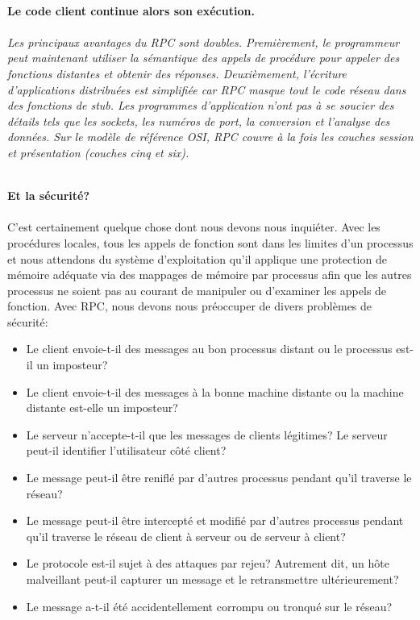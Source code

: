 \textbf{\\Le code client continue alors son exécution.}\\\\
\emph{Les principaux avantages du RPC sont doubles. Premièrement, le programmeur peut maintenant utiliser la sémantique des appels de procédure pour appeler des fonctions distantes et obtenir des réponses. Deuxièmement, l'écriture d'applications distribuées est simplifiée car RPC masque tout le code réseau dans des fonctions de stub. Les programmes d'application n'ont pas à se soucier des détails tels que les sockets, les numéros de port, la conversion et l'analyse des données. Sur le modèle de référence OSI, RPC couvre à la fois les couches session et présentation (couches cinq et six).}

\textbf{\\Et la sécurité?}\\\\
C'est certainement quelque chose dont nous devons nous inquiéter. Avec les procédures locales, tous les appels de fonction sont dans les limites d'un processus et nous attendons du système d'exploitation qu'il applique une protection de mémoire adéquate via des mappages de mémoire par processus afin que les autres processus ne soient pas au courant de manipuler ou d'examiner les appels de fonction. Avec RPC, nous devons nous préoccuper de divers problèmes de sécurité:
\begin{itemize}[label=$\ast$]
	\item Le client envoie-t-il des messages au bon processus distant ou le processus est-il un imposteur?
	\item Le client envoie-t-il des messages à la bonne machine distante ou la machine distante est-elle un imposteur?
	\item Le serveur n'accepte-t-il que les messages de clients légitimes? Le serveur peut-il identifier l'utilisateur côté client?
	\item Le message peut-il être reniflé par d'autres processus pendant qu'il traverse le réseau?
	\item Le message peut-il être intercepté et modifié par d'autres processus pendant qu'il traverse le réseau de client à serveur ou de serveur à client?
	\item Le protocole est-il sujet à des attaques par rejeu? Autrement dit, un hôte malveillant peut-il capturer un message et le retransmettre ultérieurement?
	\item Le message a-t-il été accidentellement corrompu ou tronqué sur le réseau?
\end{itemize}
\hfill \break


